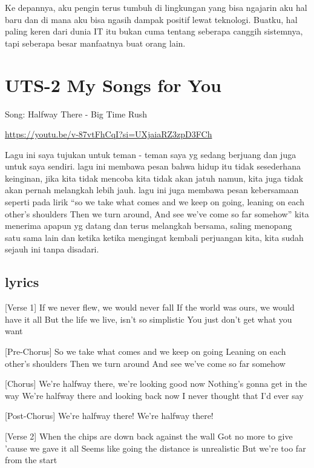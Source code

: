\documentclass[
  letterpaper,
  DIV=11,
  numbers=noendperiod]{scrreprt}
\begin{document}
Ke depannya, aku pengin terus tumbuh di lingkungan yang bisa ngajarin
aku hal baru dan di mana aku bisa ngasih dampak positif lewat teknologi.
Buatku, hal paling keren dari dunia IT itu bukan cuma tentang seberapa
canggih sistemnya, tapi seberapa besar manfaatnya buat orang lain.


\chapter{UTS-2 My Songs for You}\label{uts-2-my-songs-for-you}

Song: Halfway There - Big Time Rush

\url{https://youtu.be/v-87vtFhCqI?si=UXjaiaRZ3zpD3FCh}

Lagu ini saya tujukan untuk teman - teman saya yg sedang berjuang dan
juga untuk saya sendiri. lagu ini membawa pesan bahwa hidup itu tidak
sesederhana keinginan, jika kita tidak mencoba kita tidak akan jatuh
namun, kita juga tidak akan pernah melangkah lebih jauh. lagu ini juga
membawa pesan kebersamaan seperti pada lirik ``so we take what comes and
we keep on going, leaning on each other's shoulders Then we turn around,
And see we've come so far somehow'' kita menerima apapun yg datang dan
terus melangkah bersama, saling menopang satu sama lain dan ketika
ketika mengingat kembali perjuangan kita, kita sudah sejauh ini tanpa
disadari.

\section{lyrics}\label{lyrics}

{[}Verse 1{]} If we never flew, we would never fall If the world was
ours, we would have it all But the life we live, isn't so simplistic You
just don't get what you want

{[}Pre-Chorus{]} So we take what comes and we keep on going Leaning on
each other's shoulders Then we turn around And see we've come so far
somehow

{[}Chorus{]} We're halfway there, we're looking good now Nothing's gonna
get in the way We're halfway there and looking back now I never thought
that I'd ever say

{[}Post-Chorus{]} We're halfway there! We're halfway there!

{[}Verse 2{]} When the chips are down back against the wall Got no more
to give 'cause we gave it all Seems like going the distance is
unrealistic But we're too far from the start
\end{document}
